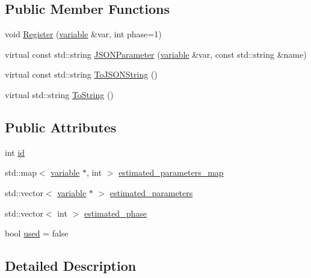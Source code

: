 \subsection*{Public Member Functions}
\begin{DoxyCompactItemize}
\item 
void \hyperlink{structmas_1_1_model_object_aefad28a4f78daee1ead3eaa0a44577ae}{Register} (\hyperlink{structmas_1_1_model_object_a4e62fdbb5826f8fac311262b888ab10a}{variable} \&var, int phase=1)
\item 
virtual const std\-::string \hyperlink{structmas_1_1_model_object_a68948da33f7370cfea0f07bbe072a439}{J\-S\-O\-N\-Parameter} (\hyperlink{structmas_1_1_model_object_a4e62fdbb5826f8fac311262b888ab10a}{variable} \&var, const std\-::string \&name)
\item 
virtual const std\-::string \hyperlink{structmas_1_1_model_object_af40b3c89b11919fc5aea21dcf1cd027b}{To\-J\-S\-O\-N\-String} ()
\item 
virtual std\-::string \hyperlink{structmas_1_1_model_object_a8eaf6c7c52e42ea8869aefa318358cb5}{To\-String} ()
\end{DoxyCompactItemize}
\subsection*{Public Attributes}
\begin{DoxyCompactItemize}
\item 
int \hyperlink{structmas_1_1_model_object_a1455cdfd12f282766b0689f3a345dbb7}{id}
\item 
std\-::map$<$ \hyperlink{structmas_1_1_model_object_a4e62fdbb5826f8fac311262b888ab10a}{variable} $\ast$, int $>$ \hyperlink{structmas_1_1_model_object_aaea24720c307701c6c4494088013cc46}{estimated\-\_\-parameters\-\_\-map}
\item 
std\-::vector$<$ \hyperlink{structmas_1_1_model_object_a4e62fdbb5826f8fac311262b888ab10a}{variable} $\ast$ $>$ \hyperlink{structmas_1_1_model_object_ae9b9d70e413f78bf9b566eba16d1e71c}{estimated\-\_\-parameters}
\item 
std\-::vector$<$ int $>$ \hyperlink{structmas_1_1_model_object_a6e26b63869a25bbe17a8d57e4d4ab77a}{estimated\-\_\-phase}
\item 
bool \hyperlink{structmas_1_1_model_object_a47d30dfc08290aebd94cf3096d53ef6a}{used} = false
\end{DoxyCompactItemize}


\subsection{Detailed Description}
